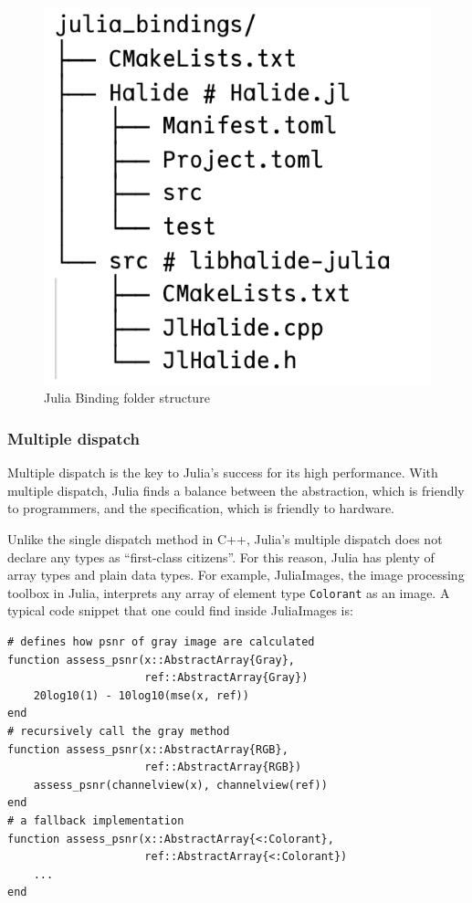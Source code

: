 \documentclass{article}
\begin{document}
\begin{figure}
    \centering
    \includegraphics[scale=0.35]{julia_bindings_structure.png}
    \caption{Julia Binding folder structure}
    \label{fig:jl_folder}
\end{figure}

\subsubsection{Multiple dispatch}

Multiple dispatch is the key to Julia's success for its high performance. With multiple dispatch, Julia finds a balance between the abstraction, which is friendly to programmers, and the specification, which is friendly to hardware.

Unlike the single dispatch method in C++, Julia's multiple dispatch does not declare any types as ``first-class citizens''. For this reason, Julia has plenty of array types and plain data types. For example, JuliaImages, the image processing toolbox in Julia, interprets any array of element type \lstinline{Colorant} as an image. A typical code snippet that one could find inside JuliaImages is:

\begin{lstlisting}[language=JuliaLocal]
# defines how psnr of gray image are calculated
function assess_psnr(x::AbstractArray{Gray},
                     ref::AbstractArray{Gray})
    20log10(1) - 10log10(mse(x, ref))
end
# recursively call the gray method
function assess_psnr(x::AbstractArray{RGB},
                     ref::AbstractArray{RGB})
    assess_psnr(channelview(x), channelview(ref))
end
# a fallback implementation
function assess_psnr(x::AbstractArray{<:Colorant},
                     ref::AbstractArray{<:Colorant})
    ...
end
\end{lstlisting}
\end{document}
